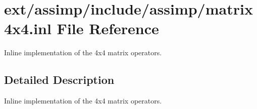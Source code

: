 \hypertarget{matrix4x4_8inl}{\section{ext/assimp/include/assimp/matrix4x4.inl File Reference}
\label{matrix4x4_8inl}
}


Inline implementation of the 4x4 matrix operators.  




\subsection{Detailed Description}
Inline implementation of the 4x4 matrix operators. 